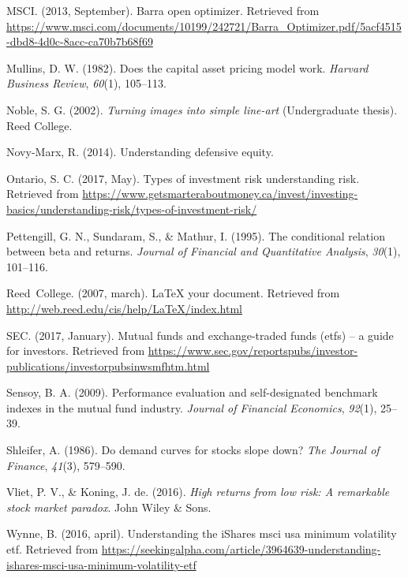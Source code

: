 \documentclass[12pt,twoside]{reedthesis}
\theoremstyle{definition}
\theoremstyle{definition}
\theoremstyle{definition}
\theoremstyle{remark}
\begin{document}
\hypertarget{ref-msci2013}{}
MSCI. (2013, September). Barra open optimizer. Retrieved from
\url{https://www.msci.com/documents/10199/242721/Barra_Optimizer.pdf/5acf4515-dbd8-4d0c-8acc-ca70b7b68f69}

\hypertarget{ref-mullins1982}{}
Mullins, D. W. (1982). Does the capital asset pricing model work.
\emph{Harvard Business Review}, \emph{60}(1), 105--113.

\hypertarget{ref-noble2002}{}
Noble, S. G. (2002). \emph{Turning images into simple line-art}
(Undergraduate thesis). Reed College.

\hypertarget{ref-novy2014}{}
Novy-Marx, R. (2014). Understanding defensive equity.

\hypertarget{ref-ontario2017}{}
Ontario, S. C. (2017, May). Types of investment risk \textbar{}
understanding risk. Retrieved from
\url{https://www.getsmarteraboutmoney.ca/invest/investing-basics/understanding-risk/types-of-investment-risk/}

\hypertarget{ref-pettengill1995}{}
Pettengill, G. N., Sundaram, S., \& Mathur, I. (1995). The conditional
relation between beta and returns. \emph{Journal of Financial and
Quantitative Analysis}, \emph{30}(1), 101--116.

\hypertarget{ref-reedweb2007}{}
Reed~College. (2007, march). LaTeX your document. Retrieved from
\url{http://web.reed.edu/cis/help/LaTeX/index.html}

\hypertarget{ref-sec2017}{}
SEC. (2017, January). Mutual funds and exchange-traded funds (etfs) -- a
guide for investors. Retrieved from
\url{https://www.sec.gov/reportspubs/investor-publications/investorpubsinwsmfhtm.html}

\hypertarget{ref-sensoy2009}{}
Sensoy, B. A. (2009). Performance evaluation and self-designated
benchmark indexes in the mutual fund industry. \emph{Journal of
Financial Economics}, \emph{92}(1), 25--39.

\hypertarget{ref-shleifer1986}{}
Shleifer, A. (1986). Do demand curves for stocks slope down? \emph{The
Journal of Finance}, \emph{41}(3), 579--590.

\hypertarget{ref-van2016}{}
Vliet, P. V., \& Koning, J. de. (2016). \emph{High returns from low
risk: A remarkable stock market paradox}. John Wiley \& Sons.

\hypertarget{ref-wynne2016}{}
Wynne, B. (2016, april). Understanding the iShares msci usa minimum
volatility etf. Retrieved from
\url{https://seekingalpha.com/article/3964639-understanding-ishares-msci-usa-minimum-volatility-etf}


\end{document}
